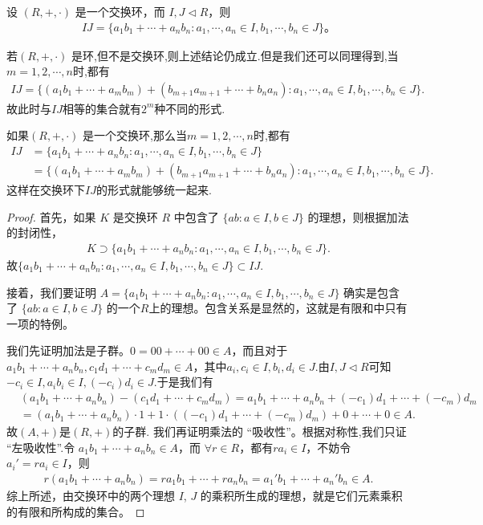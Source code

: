 \documentclass[../../main.tex]{subfiles}
\begin{document}
\begin{proposition}\label{proposition:理想的乘法表示形式}
设 $(R, +, \cdot)$ 是一个交换环，而 $I, J \lhd R$，则
\begin{align*}
IJ = \{a_1b_1 + \cdots + a_nb_n : a_1, \cdots, a_n \in I, b_1, \cdots, b_n \in J\} 。
\end{align*}
\end{proposition}
\begin{remark}
若$(R, +, \cdot)$ 是环,但不是交换环,则上述结论仍成立.但是我们还可以同理得到,当$m=1,2,\cdots,n$时,都有
\begin{align*}
IJ=\{\left( a_1b_1+\cdots +a_mb_m \right) +\left( b_{m+1}a_{m+1}+\cdots +b_na_n \right) :a_1,\cdots ,a_n\in I,b_1,\cdots ,b_n\in J\}.
\end{align*}
故此时与$IJ$相等的集合就有$2^m$种不同的形式.

如果$(R, +, \cdot)$ 是一个交换环,那么当$m=1,2,\cdots,n$时,都有
\begin{align*}
IJ&=\{a_1b_1+\cdots +a_nb_n:a_1,\cdots ,a_n\in I,b_1,\cdots ,b_n\in J\}
\\
&=\{\left( a_1b_1+\cdots +a_mb_m \right) +\left( b_{m+1}a_{m+1}+\cdots +b_na_n \right) :a_1,\cdots ,a_n\in I,b_1,\cdots ,b_n\in J\}.
\end{align*}
这样在交换环下$IJ$的形式就能够统一起来.
\end{remark}
\begin{proof}
首先，如果 $K$ 是交换环 $R$ 中包含了 $\{ab : a \in I, b \in J\}$ 的理想，则根据加法的封闭性，
\begin{align*}
K \supset \{a_1b_1 + \cdots + a_nb_n : a_1, \cdots, a_n \in I, b_1, \cdots, b_n \in J\} .
\end{align*}
故$\{a_1b_1 + \cdots + a_nb_n : a_1, \cdots, a_n \in I, b_1, \cdots, b_n \in J\} \subset IJ$.

接着，我们要证明 $A=\{a_1b_1 + \cdots + a_nb_n : a_1, \cdots, a_n \in I, b_1, \cdots, b_n \in J\}$ 确实是包含了 $\{ab : a \in I, b \in J\}$ 的一个$R$上的理想。包含关系是显然的，这就是有限和中只有一项的特例。

我们先证明加法是子群。$0 = 00 + \cdots + 00\in A$，而且对于 $a_1b_1 + \cdots + a_nb_n, c_1d_1 + \cdots + c_md_m \in A$，其中$a_i,c_i\in I,b_i,d_i\in J$.由$I,J\lhd R$可知$-c_i\in I,a_ib_i\in I,(-c_i)d_i\in J$.于是我们有
\begin{align*}
&(a_1b_1+\cdots +a_nb_n)-(c_1d_1+\cdots +c_md_m)=a_1b_1+\cdots +a_nb_n+(-c_1)d_1+\cdots +(-c_m)d_m
\\
&=\left( a_1b_1+\cdots +a_nb_n \right) \cdot 1+1\cdot \left( (-c_1)d_1+\cdots +(-c_m)d_m \right) +0+\cdots +0\in A.
\end{align*}
故$(A,+)$是$(R,+)$的子群.
我们再证明乘法的 “吸收性”。根据对称性,我们只证
“左吸收性”.令 $a_1b_1 + \cdots + a_nb_n \in A$，而 $\forall r \in R$，都有$ ra_i \in I$，不妨令 $a_i' = ra_i \in I$，则
\begin{align*}
r(a_1b_1 + \cdots + a_nb_n) = ra_1b_1 + \cdots + ra_nb_n = a_1'b_1 + \cdots + a_n'b_n \in A.
\end{align*}
综上所述，由交换环中的两个理想 $I$, $J$ 的乘积所生成的理想，就是它们元素乘积的有限和所构成的集合。
\end{proof}
\end{document}
